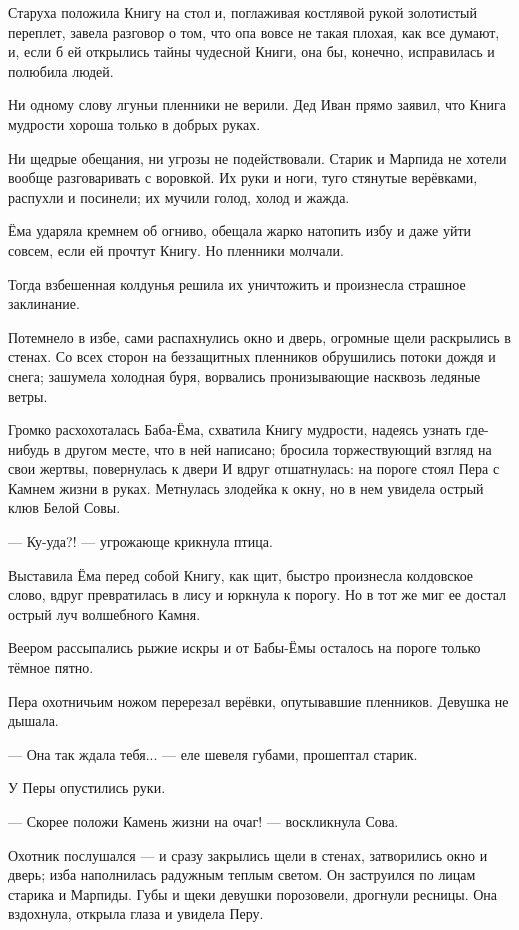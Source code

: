 \documentclass[oneside,final,14pt]{extreport}
\begin{document}
	Старуха положила Книгу на стол и, поглаживая костлявой рукой золотистый переплет, завела разговор о том, что опа вовсе не такая плохая, как все думают, и, если б ей открылись тайны чудесной Книги, она бы, конечно, исправилась и полюбила людей.
	
	Ни одному слову лгуньи пленники не верили. Дед Иван прямо заявил, что Книга мудрости хороша только в добрых руках.
	
	Ни щедрые обещания, ни угрозы не подействовали. Старик и Марпида не хотели вообще разговаривать с воровкой. Их руки и ноги, туго стянутые верёвками, распухли и посинели; их мучили голод, холод и жажда.
	
	Ёма ударяла кремнем об огниво, обещала жарко натопить избу и даже уйти совсем, если ей прочтут Книгу. Но пленники молчали.
	
	Тогда взбешенная колдунья решила их уничтожить и произнесла страшное заклинание.
	
	Потемнело в избе, сами распахнулись окно и дверь, огромные щели раскрылись в стенах. Со всех сторон на беззащитных пленников обрушились потоки дождя и снега; зашумела холодная буря, ворвались пронизывающие насквозь ледяные ветры.
	
	Громко расхохоталась Баба-Ёма, схватила Книгу мудрости, надеясь узнать где-нибудь в другом месте, что в ней написано; бросила торжествующий взгляд на свои жертвы, повернулась к двери И вдруг отшатнулась: на пороге стоял Пера с Камнем жизни в руках. Метнулась злодейка к окну, но в нем увидела острый клюв Белой Совы.
	
	— Ку-уда?! — угрожающе крикнула птица.
	
	Выставила Ёма перед собой Книгу, как щит, быстро произнесла колдовское слово, вдруг превратилась в лису и юркнула к порогу. Но в тот же миг ее достал острый луч волшебного Камня.
	
	Веером рассыпались рыжие искры и от Бабы-Ёмы осталось на пороге только тёмное пятно.
	
	Пера охотничьим ножом перерезал верёвки, опутывавшие пленников. Девушка не дышала.
	
	— Она так ждала тебя... — еле шевеля губами, прошептал старик.
	
	У Перы опустились руки.
	
	— Скорее положи Камень жизни на очаг! — воскликнула Сова.
	
	Охотник послушался — и сразу закрылись щели в стенах, затворились окно и дверь; изба наполнилась радужным теплым светом. Он заструился по лицам старика и Марпиды. Губы и щеки девушки порозовели, дрогнули ресницы. Она вздохнула, открыла глаза и увидела Перу.
	
\end{document}
